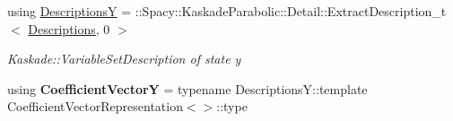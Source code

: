 \begin{DoxyCompactItemize}
\item 
\hypertarget{group__KaskadeParabolicGroup_ga68cff5860ecaab2ac4f6ea66c76ecb2c}{using \hyperlink{group__KaskadeParabolicGroup_ga68cff5860ecaab2ac4f6ea66c76ecb2c}{Descriptions\-Y} = \-::Spacy\-::\-Kaskade\-Parabolic\-::\-Detail\-::\-Extract\-Description\-\_\-t$<$ \hyperlink{group__KaskadeParabolicGroup_gab8c662bd21758959d061a447fb8d12b7}{Descriptions}, 0 $>$}\label{group__KaskadeParabolicGroup_ga68cff5860ecaab2ac4f6ea66c76ecb2c}

\begin{DoxyCompactList}\small\item\em Kaskade\-::\-Variable\-Set\-Description of state y \end{DoxyCompactList}\item 
\hypertarget{group__KaskadeParabolicGroup_gaf8c5e30f599791c3a9df7ca678260162}{using {\bfseries Coefficient\-Vector\-Y} = typename Descriptions\-Y\-::template Coefficient\-Vector\-Representation$<$$>$\-::type}\label{group__KaskadeParabolicGroup_gaf8c5e30f599791c3a9df7ca678260162}

\end{DoxyCompactItemize}
